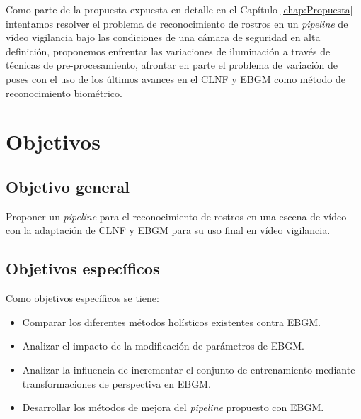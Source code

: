 Como parte de la propuesta expuesta en detalle en el Capítulo \ref{chap:Propuesta} intentamos resolver el problema de reconocimiento de rostros en un \textit{pipeline} de vídeo vigilancia bajo las condiciones de una cámara de seguridad en alta definición, proponemos enfrentar las variaciones de iluminación a través de técnicas de pre-procesamiento, afrontar en parte el problema de variación de poses con el uso de los últimos avances en el \acf{CLNF} y \acf{EBGM} como método de reconocimiento biométrico. 

\section{Objetivos}\label{scc:Objetivos}

\subsection{Objetivo general}
Proponer un \textit{pipeline} para el reconocimiento de rostros en una escena de vídeo con la adaptación de \acf{CLNF} y \acf{EBGM} para su uso final en vídeo vigilancia.

\subsection{Objetivos específicos}
Como objetivos específicos se tiene:
\begin{itemize}
\item Comparar los diferentes métodos holísticos existentes contra \ac{EBGM}.
\item Analizar el impacto de la modificación de parámetros de \ac{EBGM}.
\item Analizar la influencia de incrementar el conjunto de entrenamiento mediante transformaciones de perspectiva en \ac{EBGM}.
\item Desarrollar los métodos de mejora del \textit{pipeline} propuesto con \ac{EBGM}.
\end{itemize}

